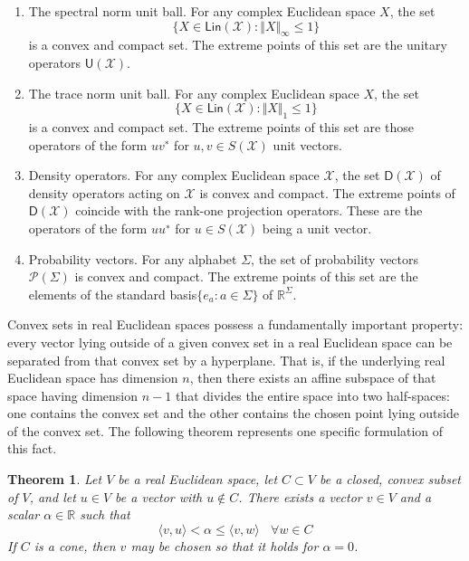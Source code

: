 \documentclass[aps,pra,onecolumn,notitlepage,superscriptaddress]{revtex4-1}
\newcommand{\R}{\mathbb{R}}
\newcommand{\spc}[1]{\mathcal{#1}}
\newcommand{\Lin}{\mathsf{Lin}}
\newcommand{\D}{\mathsf{D}}
\newcommand{\U}{\mathsf{U}}
\def\>{\rangle}
\def\<{\langle}
\newtheorem{theo}{Theorem}
\begin{document}
    \begin{enumerate}
        \item The spectral norm unit ball.  For any complex Euclidean space $X$, the set
        \begin{equation}
            \{ X \in \Lin(\spc X) : \Vert X \Vert_\infty \leq 1 \}
        \end{equation}
        is a convex and compact set. The extreme points of this set are the unitary operators $\U(\spc X)$.

        \item The trace norm unit ball. For any complex Euclidean space $X$, the set
        \begin{equation}
            \{ X \in \Lin(\spc X) : \Vert X \Vert_1 \leq 1 \}
        \end{equation}
        is a convex and compact set. The extreme points of this set are those operators of the form $uv^∗$ for $u,v \in S(\spc X)$ unit vectors.
        \item Density operators. For any complex Euclidean space $\spc X$, the set $\D(\spc X)$ of density operators acting on $\spc X$ is convex and compact. The extreme points of $\D(\spc X)$ coincide with the rank-one projection operators. These are the operators of the form $uu^∗$ for $u \in S(\spc X)$ being a unit vector.
        \item Probability vectors. For any alphabet $\Sigma$, the set of probability vectors $\spc P(\Sigma)$ is convex and compact. The extreme points of this set are the elements of the standard basis$\{e_a : a \in \Sigma\}$ of $\R^\Sigma$.
    \end{enumerate}

    Convex sets in real Euclidean spaces possess a fundamentally important property: every vector lying outside of a given convex set in a real Euclidean space can be separated from that convex set by a hyperplane. That is, if the underlying real Euclidean space has dimension $n$, then there exists an affine subspace of that space having dimension $n−1$ that divides the entire space into two half-spaces: one contains the convex set and the other contains the chosen point lying outside of the convex set. The following theorem represents one specific formulation of this fact.

    \begin{theo}
        Let $V$ be a real Euclidean space, let $C \subset V$ be a closed, convex subset of $V$, and let $u \in V$ be a vector with $u \notin C$. There exists a vector $v \in V$ and a scalar $\alpha \in \R$ such that
        \begin{equation}
            \< v,u \> < \alpha \leq \< v,w \> \ \ \ \ \forall w \in C
        \end{equation}
        If $C$ is a cone, then $v$ may be chosen so that it holds for $\alpha = 0$.
    \end{theo}
\end{document}
